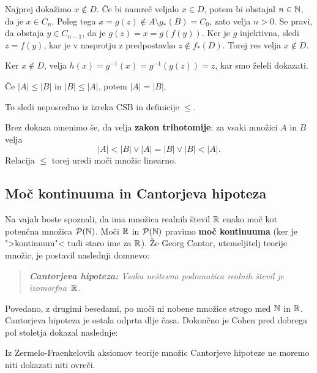 \begin{dokaz}
\begin{enumerate}
    Najprej dokažimo $x \not\in D$. Če bi namreč veljalo $x \in D$, potem bi
    obstajal $n \in \mathbb{N}$, da je $x \in C_n$. Poleg tega
    $x = g(z) \not\in A \setminus g_{*}(B) = C_0$, zato velja $n > 0$. Se pravi,
    da obstaja $y \in C_{n-1}$, da je $g(z) = x = g(f(y))$. Ker je $g$
    injektivna, sledi $z = f(y)$, kar je v nasprotju z predpostavko
    $z \not\in f_{*}(D)$. Torej res velja $x \not\in D$.

    Ker $x \not\in D$, velja $h(x) = g^{-1}(x) = g^{-1}(g(z)) = z$, kar smo
    želeli dokazati.
  \end{enumerate}
\end{dokaz}

\begin{posledica}
  Če $|A| \leq |B|$ in $|B| \leq |A|$, potem $|A| = |B|$.
\end{posledica}

\begin{dokaz}
  To sledi neposredno iz izreka CSB in definicije $\leq$.
\end{dokaz}

Brez dokaza omenimo še, da velja \textbf{zakon trihotomije}: za vsaki množici $A$ in $B$
velja
%
\begin{equation*}
  |A| < |B| \lor |A| = |B| \lor |B| < |A|.
\end{equation*}
%
Relacija $\leq$ torej uredi moči množic linearno.



\subsection{Moč kontinuuma in Cantorjeva hipoteza}

Na vajah boste spoznali, da ima množica realnih števil $\mathbb{R}$ enako moč kot potenčna množica $\mathcal{P}(\mathbb{N})$. Moči $\mathbb{R}$ in $\mathcal{P}(\mathbb{N})$ pravimo \textbf{moč kontinuuma} (ker je ">kontinuum"< tudi staro ime za $\mathbb{R}$). Že Georg Cantor, utemeljitelj teorije množic, je postavil naslednji domnevo:
%
\begin{quote}
  \emph{\textbf{Cantorjeva hipoteza:} Vsaka neštevna podmnožica realnih števil je izomorfna~$\mathbb{R}$.}
\end{quote}
%
Povedano, z drugimi besedami, po moči ni nobene množice strogo med $\mathbb{N}$ in $\mathbb{R}$. Cantorjeva hipoteza je ostala odprta dlje časa. Dokončno je Cohen pred dobrega pol stoletja dokazal naslednje:

\begin{izrek}[Cohen]
  Iz Zermelo-Fraenkelovih aksiomov teorije množic Cantorjeve hipoteze ne moremo niti dokazati niti ovreči.
\end{izrek}

